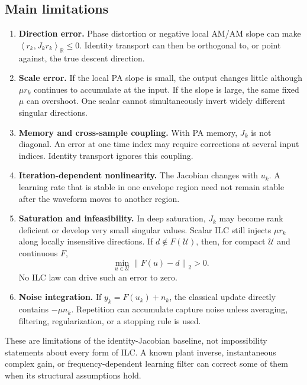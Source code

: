 \documentclass[10pt,a4paper]{article}
\newcommand{\Rinner}[2]{\left\langle #1,#2\right\rangle_{\mathbb R}}
\newcommand{\norm}[1]{\left\lVert #1\right\rVert_2}
\begin{document}
\subsection{Main limitations}

\begin{enumerate}
  \item \textbf{Direction error.} Phase distortion or negative local AM/AM slope can make
  $\Rinner{r_k}{J_k r_k}\leq 0$. Identity transport can then be orthogonal to, or point against, the true
  descent direction.

  \item \textbf{Scale error.} If the local PA slope is small, the output changes little although $\mu r_k$
  continues to accumulate at the input. If the slope is large, the same fixed $\mu$ can overshoot. One scalar
  cannot simultaneously invert widely different singular directions.

  \item \textbf{Memory and cross-sample coupling.} With PA memory, $J_k$ is not diagonal. An error at one
  time index may require corrections at several input indices. Identity transport ignores this coupling.

  \item \textbf{Iteration-dependent nonlinearity.} The Jacobian changes with $u_k$. A learning rate that is
  stable in one envelope region need not remain stable after the waveform moves to another region.

  \item \textbf{Saturation and infeasibility.} In deep saturation, $J_k$ may become rank deficient or develop
  very small singular values. Scalar ILC still injects $\mu r_k$ along locally insensitive directions. If
  $d\notin F(\mathcal U)$, then, for compact $\mathcal U$ and continuous $F$,
  \begin{equation}
    \min_{u\in\mathcal U}\norm{F(u)-d}>0.
    \label{eq:unreachable-target}
  \end{equation}
  No ILC law can drive such an error to zero.

  \item \textbf{Noise integration.} If $y_k=F(u_k)+n_k$, the classical update directly contains
  $-\mu n_k$. Repetition can accumulate capture noise unless averaging, filtering, regularization, or a
  stopping rule is used.
\end{enumerate}

These are limitations of the identity-Jacobian baseline, not impossibility statements about every form of
ILC. A known plant inverse, instantaneous complex gain, or frequency-dependent learning filter can correct
some of them when its structural assumptions hold.
\end{document}

